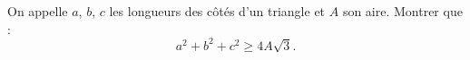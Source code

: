 On appelle $a$, $b$, $c$ les longueurs des côtés d'un triangle et $A$ son aire. Montrer que :
\[
a^2 + b^2 + c^2 \geq 4A\sqrt{3}.
\]
